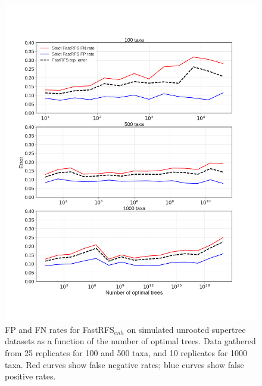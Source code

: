 \begin{figure}
  \centering
  \includegraphics[width=\textwidth]{siesta-supp-figs/fastrfs_ntrees_vs_err}
  \caption[FP and FN rates for FastRFS$_{enh}$ on  simulated unrooted
    supertree datasets as a function of the number of optimal
    trees]{FP and FN rates for FastRFS$_{enh}$ on  simulated unrooted
    supertree datasets as a function of the number of optimal
    trees. Data gathered from 25 replicates for 100 and 500 taxa, and
    10 replicates for 1000 taxa. Red curves show false negative rates;
    blue curves show false positive rates.}
  \label{fig:supertree-consensus-comparison-2}
\end{figure}






